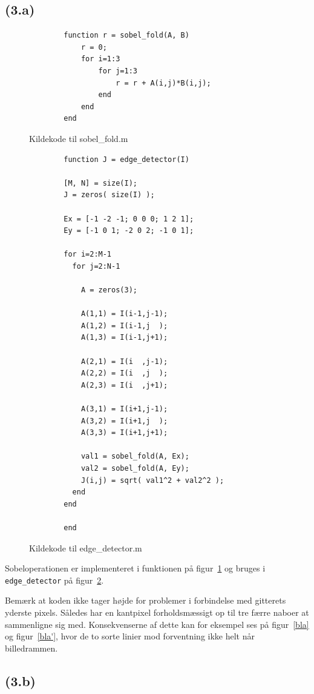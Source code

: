 \documentclass{article}
\begin{document}
\subsection*{(3.a)}

\begin{figure}
	\begin{verbatim}
		function r = sobel_fold(A, B)
		    r = 0;
		    for i=1:3
		        for j=1:3
		            r = r + A(i,j)*B(i,j);
		        end
		    end
		end
	\end{verbatim}
	\caption{Kildekode til sobel\_fold.m}
	\label{sobelfold}
\end{figure}

\begin{figure}
	\begin{verbatim}
		function J = edge_detector(I)

		[M, N] = size(I);
		J = zeros( size(I) );

		Ex = [-1 -2 -1; 0 0 0; 1 2 1];
		Ey = [-1 0 1; -2 0 2; -1 0 1];

		for i=2:M-1
		  for j=2:N-1

		    A = zeros(3);

		    A(1,1) = I(i-1,j-1);
		    A(1,2) = I(i-1,j  );
		    A(1,3) = I(i-1,j+1);

		    A(2,1) = I(i  ,j-1);
		    A(2,2) = I(i  ,j  );
		    A(2,3) = I(i  ,j+1);

		    A(3,1) = I(i+1,j-1);
		    A(3,2) = I(i+1,j  );
		    A(3,3) = I(i+1,j+1);

		    val1 = sobel_fold(A, Ex);
		    val2 = sobel_fold(A, Ey);
		    J(i,j) = sqrt( val1^2 + val2^2 );
		  end
		end

		end
	\end{verbatim}
	\caption{Kildekode til edge\_detector.m}
	\label{edgedetector}
\end{figure}

Sobeloperationen er implementeret i funktionen på figur~\ref{sobelfold} og bruges i {\tt edge\_detector} på figur~\ref{edgedetector}.

Bemærk at koden ikke tager højde for problemer i forbindelse med gitterets yderste pixels. Således har en kantpixel forholdsmæssigt op til tre færre naboer at sammenligne sig med. Konsekvenserne af dette kan for eksempel ses på figur~\ref{bla} og figur~\ref{bla'}, hvor de to sorte linier mod forventning ikke helt når billedrammen.

\subsection*{(3.b)}
\end{document}
